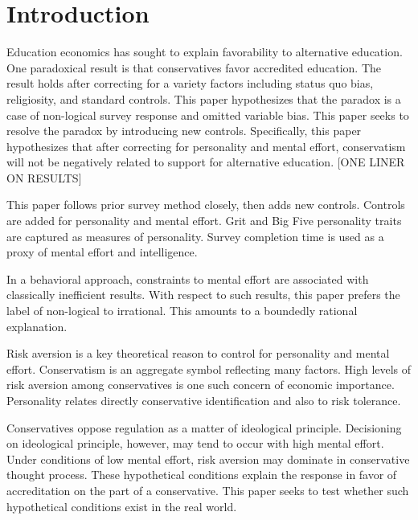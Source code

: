 \documentclass[review]{elsarticle}
\begin{document}
\section{Introduction}

Education economics has sought to explain favorability to alternative education.
One paradoxical result is that conservatives favor accredited education\cite{vandivier2020preliminary}.
The result holds after correcting for a variety factors including status quo bias, religiosity, and standard controls.
This paper hypothesizes that the paradox is a case of non-logical survey response and omitted variable bias.
This paper seeks to resolve the paradox by introducing new controls.
Specifically, this paper hypothesizes that after correcting for personality and mental effort,
conservatism will not be negatively related to support for alternative education.
    [ONE LINER ON RESULTS]

This paper follows prior survey method closely, then adds new controls.
Controls are added for personality and mental effort.
Grit and Big Five personality traits are captured as measures of personality.
Survey completion time is used as a proxy of mental effort and intelligence.

In a behavioral approach, constraints to mental effort are associated with classically inefficient results.
With respect to such results, this paper prefers the label of non-logical to irrational.
This amounts to a boundedly rational explanation\cite{candela2016vilfredo}.

Risk aversion is a key theoretical reason to control for personality and mental effort.
Conservatism is an aggregate symbol reflecting many factors\cite{hill1997liberal}.
High levels of risk aversion among conservatives is one such concern of economic importance\cite{perhac1996does}.
Personality relates directly conservative identification\cite{chirumbolo2010personality} and also to risk tolerance.

Conservatives oppose regulation as a matter of ideological principle\cite{teghtsoonian1993neo}.
Decisioning on ideological principle, however, may tend to occur with high mental effort.
Under conditions of low mental effort, risk aversion may dominate in conservative thought process.
These hypothetical conditions explain the response in favor of accreditation on the part of a conservative.
This paper seeks to test whether such hypothetical conditions exist in the real world.
\end{document}
